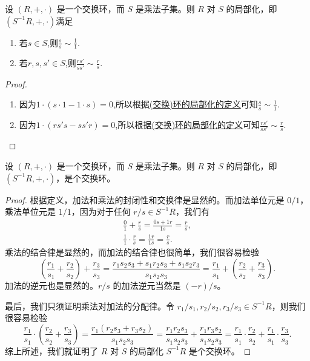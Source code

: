 \documentclass[../../main.tex]{subfiles}
\begin{document}
\begin{proposition}[(交换)环的局部化的基本性质]\label{proposition:(交换)环的局部化的基本性质}
设 $(R, +, \cdot)$ 是一个交换环，而 $S$ 是乘法子集。则 $R$ 对 $S$ 的局部化，即 $(S^{-1}R, +, \cdot)$满足
\begin{enumerate}[(1)]
\item 若$s\in S$,则$\frac{s}{s}\sim \frac{1}{1}.$

\item 若$r,s,s'\in S$,则$\frac{rs'}{ss'}\sim \frac{r}{s}.$
\end{enumerate}
\end{proposition}
\begin{proof}
\begin{enumerate}[(1)]
\item 因为$1\cdot (s\cdot1-1\cdot s)=0$,所以根据\hyperref[definition:(交换)环的局部化]{(交换)环的局部化的定义}可知$\frac{s}{s}\sim \frac{1}{1}.$

\item 因为$1\cdot (rs's-ss'r)=0$,所以根据\hyperref[definition:(交换)环的局部化]{(交换)环的局部化的定义}可知$\frac{rs'}{ss'}\sim \frac{r}{s}.$
\end{enumerate}

\end{proof}

\begin{proposition}[(交换)环的局部化还是交换环]\label{proposition:(交换)环的局部化还是交换环}
设 $(R, +, \cdot)$ 是一个交换环，而 $S$ 是乘法子集。则 $R$ 对 $S$ 的局部化，即 $(S^{-1}R, +, \cdot)$，是个交换环。
\end{proposition}
\begin{proof}
根据定义，加法和乘法的封闭性和交换律是显然的。而加法单位元是 $0/1$，乘法单位元是 $1/1$，因为对于任何 $r/s \in S^{-1}R$，我们有
\begin{gather*}
\frac{0}{1} + \frac{r}{s} = \frac{0s + 1r}{1s} = \frac{r}{s},\\
\frac{1}{1} \cdot \frac{r}{s} = \frac{1r}{1s} = \frac{r}{s}.
\end{gather*}
乘法的结合律是显然的，而加法的结合律也很简单，我们很容易检验
\[
\left(\frac{r_1}{s_1} + \frac{r_2}{s_2}\right) + \frac{r_3}{s_3} = \frac{r_1s_2s_3 + s_1r_2s_3 + s_1s_2r_3}{s_1s_2s_3} = \frac{r_1}{s_1} + \left(\frac{r_2}{s_2} + \frac{r_3}{s_3}\right).
\]
加法的逆元也是显然的。$r/s$ 的加法逆元当然是 $(-r)/s$。

最后，我们只须证明乘法对加法的分配律。令 $r_1/s_1, r_2/s_2, r_3/s_3 \in S^{-1}R$，则我们很容易检验
\[
\frac{r_1}{s_1} \cdot \left(\frac{r_2}{s_2} + \frac{r_3}{s_3}\right) = \frac{r_1(r_2s_3 + r_3s_2)}{s_1s_2s_3} = \frac{r_1r_2s_3}{s_1s_2s_3} + \frac{r_1r_3s_2}{s_1s_2s_3} = \frac{r_1}{s_1} \cdot \frac{r_2}{s_2} + \frac{r_1}{s_1} \cdot \frac{r_3}{s_3}.
\]
综上所述，我们就证明了 $R$ 对 $S$ 的局部化 $S^{-1}R$ 是个交换环。 

\end{proof}
\end{document}
